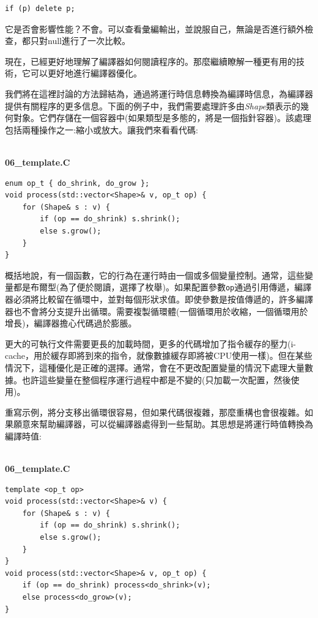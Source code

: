 \begin{lstlisting}[style=styleCXX]
if (p) delete p; 
\end{lstlisting}

它是否會影響性能？不會。可以查看彙編輸出，並說服自己，無論是否進行額外檢查，都只對null進行了一次比較。 

現在，已經更好地理解了編譯器如何閱讀程序的。那麼繼續瞭解一種更有用的技術，它可以更好地進行編譯器優化。


我們將在這裡討論的方法歸結為，通過將運行時信息轉換為編譯時信息，為編譯器提供有關程序的更多信息。下面的例子中，我們需要處理許多由\textit{Shape}類表示的幾何對象。它們存儲在一個容器中(如果類型是多態的，將是一個指針容器)。該處理包括兩種操作之一:縮小或放大。讓我們來看看代碼:

\hspace*{\fill} \\ %
\noindent
\textbf{06\_template.C}
\begin{lstlisting}[style=styleCXX]
enum op_t { do_shrink, do_grow };
void process(std::vector<Shape>& v, op_t op) {
	for (Shape& s : v) {
		if (op == do_shrink) s.shrink();
		else s.grow();
	}
}
\end{lstlisting}

概括地說，有一個函數，它的行為在運行時由一個或多個變量控制。通常，這些變量都是布爾型(為了便於閱讀，選擇了枚舉)。如果配置參數\texttt{op}通過引用傳遞，編譯器必須將比較留在循環中，並對每個形狀求值。即使參數是按值傳遞的，許多編譯器也不會將分支提升出循環。需要複製循環體(一個循環用於收縮，一個循環用於增長)，編譯器擔心代碼過於膨脹。 

更大的可執行文件需要更長的加載時間，更多的代碼增加了指令緩存的壓力(i-cache，用於緩存即將到來的指令，就像數據緩存即將被CPU使用一樣)。但在某些情況下，這種優化是正確的選擇。通常，會在不更改配置變量的情況下處理大量數據。也許這些變量在整個程序運行過程中都是不變的(只加載一次配置，然後使用)。 

重寫示例，將分支移出循環很容易，但如果代碼很複雜，那麼重構也會很複雜。如果願意來幫助編譯器，可以從編譯器處得到一些幫助。其思想是將運行時值轉換為編譯時值:

\hspace*{\fill} \\ %
\noindent
\textbf{06\_template.C}
\begin{lstlisting}[style=styleCXX]
template <op_t op>
void process(std::vector<Shape>& v) {
	for (Shape& s : v) {
		if (op == do_shrink) s.shrink();
		else s.grow();
	}
}
void process(std::vector<Shape>& v, op_t op) {
	if (op == do_shrink) process<do_shrink>(v);
	else process<do_grow>(v);
}
\end{lstlisting}

